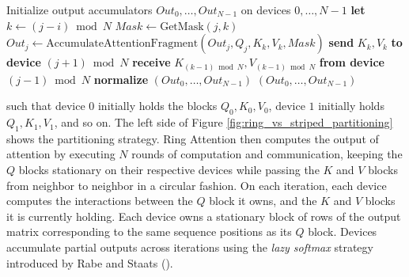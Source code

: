 \begin{algorithm*}[t]
    \caption{The Ring Attention algorithm introduced by Liu et al. (\citeyear{liu2023ring}). \\ The accumulators $\textit{Out}_0, \ldots, \textit{Out}_{N-1}$ store unnormalized partial sums of the output, as well as running softmax statistics, and the ``\textbf{normalize}'' step normalizes with respect to these statistics, as described by Rabe and Staats (\citeyear{rabe2021self}). The ``$\text{AccumulateAttentionFragment}$'' function encapsulates the logic needed to compute partial attention results on a fragment of the inputs, accumulate into the output, and update running softmax statistics. Critically, it skips computation for each tile that is masked out. The algorithm listed here serves as the backbone of both Ring Attention and Striped Attention, which differ only in how they implement the function $\text{GetMask}(j, k)$.}
    \label{alg:ringpseudocode}
\begin{algorithmic}
  \State Initialize output accumulators $\textit{Out}_0, \ldots, \textit{Out}_{N-1}$ on devices $0, \ldots, N-1$
      \State \textbf{let} $k \leftarrow (j - i) \bmod N$
      \State $\textit{Mask} \leftarrow \text{GetMask}(j, k)$
      \State $\textit{Out}_j \leftarrow \text{AccumulateAttentionFragment}(\textit{Out}_j, Q_j, K_k, V_k, \textit{Mask})$
      \State \textbf{send} $K_k, V_k$ \textbf{to device} $(j + 1) \bmod N$
      \State \textbf{receive} $K_{(k - 1) \bmod N}, V_{(k - 1) \bmod N}$ \textbf{from device} $(j - 1) \bmod N$
    \EndFor
  \EndFor \State \textbf{normalize} $(Out_0, \ldots, Out_{N-1})$
  \State \Return $(Out_0, \ldots, Out_{N-1})$
\EndProcedure
\end{algorithmic}
\end{algorithm*}

such that device $0$ initially holds the blocks $Q_0, K_0, V_0$, device $1$ initially holds $Q_1, K_1, V_1$, and so on. The left side of Figure \ref{fig:ring_vs_striped_partitioning} shows the partitioning strategy. Ring Attention then computes the output of attention by executing $N$ rounds of computation and communication, keeping the $Q$ blocks stationary on their respective devices while passing the $K$ and $V$ blocks from neighbor to neighbor in a circular fashion. On each iteration, each device computes the interactions between the $Q$ block it owns, and the $K$ and $V$ blocks it is currently holding. Each device owns a stationary block of rows of the output matrix corresponding to the same sequence positions as its $Q$ block. Devices accumulate partial outputs across iterations using the \emph{lazy softmax} strategy introduced by Rabe and Staats (\citeyear{rabe2021self}).

